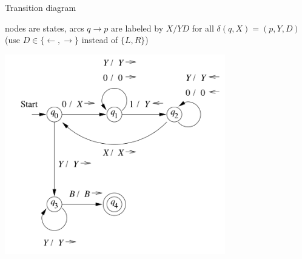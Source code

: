 \documentclass[handout]{beamer}
\begin{document}
\begin{frame}{Transition diagram}

    \vspace{-6pt}
    \alert{nodes} are states, \alert{arcs} $q\to p$ are labeled by $X/YD$ for all $\delta(q,X)=(p,Y,D)$ (use $D\in\{\leftarrow,\rightarrow\}$ instead of $\{L,R\}$)
    
    \vspace{-3pt}
    \begin{center}
        \includegraphics[width=0.72\textwidth]{files/tmTrans.PNG}
    \end{center}
    
\end{frame}
\end{document}
